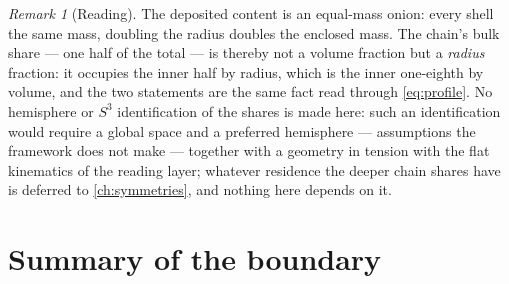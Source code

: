 \documentclass[11pt]{amsbook}
\theoremstyle{plain}
\theoremstyle{definition}
\theoremstyle{remark}
\newtheorem{remark}[theorem]{Remark}
\begin{document}
\begin{remark}[Reading]\label{rem:withdrawn-share}
The deposited content is an equal-mass onion: every shell the same mass, doubling the radius doubles the enclosed mass. The chain's bulk share --- one half of the total --- is thereby not a volume fraction but a \emph{radius} fraction: it occupies the inner half by radius, which is the inner one-eighth by volume, and the two statements are the same fact read through \cref{eq:profile}. No hemisphere or $S^{3}$ identification of the shares is made here: such an identification would require a global space and a preferred hemisphere --- assumptions the framework does not make --- together with a geometry in tension with the flat kinematics of the reading layer; whatever residence the deeper chain shares have is deferred to \cref{ch:symmetries}, and nothing here depends on it.
\end{remark}

\section{Summary of the boundary}\label{sec:boundary-summary}
\end{document}
